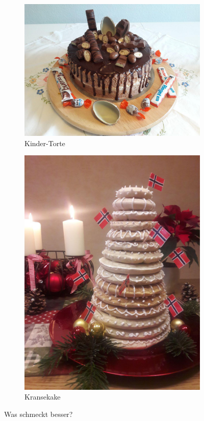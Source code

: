 \begin{figure}[h]
     \centering
     \begin{subfigure}[b]{0.55\textwidth}
         \centering
         \includegraphics[width=\textwidth]{Bilder/kindertorte}
         \caption{Kinder-Torte}
         \label{fig:2_Bilder_Bild_1}
     \end{subfigure}
     \hfill
     \begin{subfigure}[b]{0.31\textwidth}
         \centering
         \includegraphics[width=\textwidth]{Bilder/kransekake}
         \caption{Kransekake}
         \label{fig:2_Bilder_Bild_2}
     \end{subfigure}
     \caption{Was schmeckt besser?}
\end{figure}


